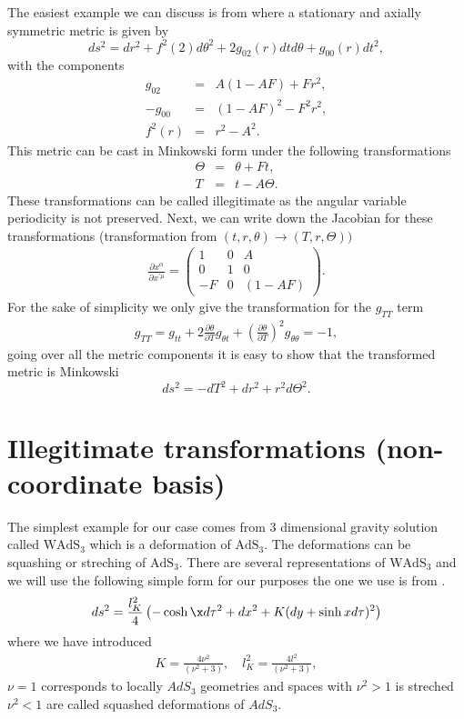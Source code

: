 \documentclass[preprint,aps,tightenlines,showkeys,nofootinbib,superscriptaddress,amsmath]{revtex4}
\begin{document}
The easiest example we can discuss is from \cite{Deser:1985pk} where a
stationary and axially symmetric metric is given by
\begin{equation}
  ds^{2}= dr^{2}+f^{2}(2)d \theta^{2}+2g_{02}(r)dt d\theta +g_{00}(r)dt^{2},
\end{equation}
with the components
\begin{eqnarray}
  g_{02}& = &A(1-AF)+Fr^{2},\\
  -g_{00}& =&(1-AF)^{2}-F^{2}r^{2},\\
  f^{2}(r)&=&r^{2}-A^{2}.
\end{eqnarray}
This metric can be cast in Minkowski form under the following transformations
\begin{eqnarray}
  \Theta &=&\theta+Ft,\label{tran1}\\
  T &=&t-A\Theta. \label{tran2}
\end{eqnarray}
These transformations can be called illegitimate as the angular
variable periodicity is not preserved. Next, we can write down the
Jacobian for these transformations (transformation from
$(t,r,\theta)\rightarrow (T,r,\Theta))$
\begin{eqnarray}
  \frac{\partial x^{\alpha} }{\partial x^{\prime\mu} }=
  \begin{pmatrix}
    1 & 0 & A \\
    0 & 1 & 0 \\
    -F & 0 & (1-AF)
  \end{pmatrix}. \label{jacobflat}
\end{eqnarray}
For the sake of simplicity we only give the transformation for the $g_{TT}$ term
\begin{eqnarray}
  g_{TT}=g_{tt}+2 \frac{\partial\theta}{\partial T} g_{\theta
  t}+\left(\frac{\partial\theta}{\partial T}\right)^{2}g_{\theta \theta }=-1,
\end{eqnarray}
going over all the metric components it is easy to show that the
transformed metric is Minkowski
\begin{equation}
  ds^{2}=-dT^{2}+ dr^{2}+r^{2}d\Theta^{2}.
\end{equation}
\section{Illegitimate transformations (non-coordinate basis)}
The simplest example for our case comes from 3 dimensional gravity
solution called $\text{WAdS}_{3}$ which is a deformation of
$\text{AdS}_3$. The deformations can be squashing or streching of
$\text{AdS}_3$. There are several representations of
$\text{WAdS}_{3}$ and we will use the following simple form for our purposes
the one we use is from \cite{Giribet:2015lfa}.
\begin{equation}
  ds^{2}=\dfrac{l^{2}_K}{4}\left(-\cosh\x d\tau^{2}+dx^{2}+K(dy+\sinh
  x d\tau )^{2}   \right)\label{warpedads}
\end{equation}
where we have introduced
\begin{eqnarray}
  K=\frac{4\nu^{2}}{(\nu ^{2}+3 )},\quad l_{K}^{2}=\frac{4l^{2}
  }{(\nu ^{2}+3 )},
\end{eqnarray}
$\nu =1$ corresponds to locally $AdS_3$ geometries and spaces with
$\nu ^{2}>1$ is streched $\nu ^{2}<1$ are called squashed
deformations of $AdS_3$.
\end{document}
